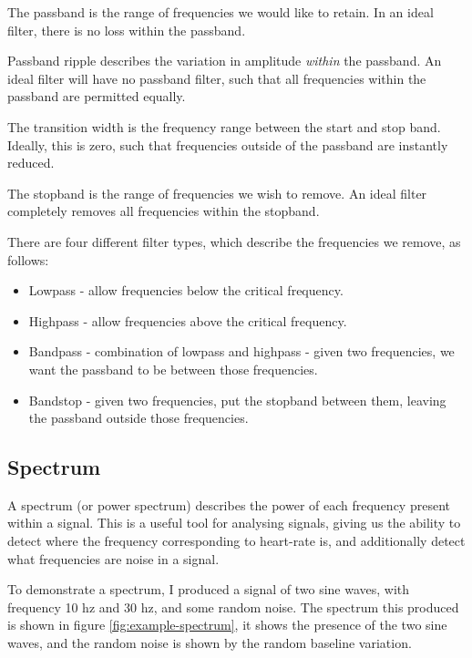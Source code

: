 \documentclass[12pt,a4paper,twoside,openany]{report}
\begin{document}
The passband is the range of frequencies we would like to retain. In an ideal
filter, there is no loss within the passband.

Passband ripple describes the variation in amplitude \emph{within} the
passband. An ideal filter will have no passband filter, such that all
frequencies within the passband are permitted equally.

The transition width is the frequency range between the start and stop band.
Ideally, this is zero, such that frequencies outside of the passband are
instantly reduced.

The stopband is the range of frequencies we wish to remove. An ideal filter
completely removes all frequencies within the stopband.

There are four different filter types, which describe the frequencies we remove, as
follows:

\begin{itemize}
	\item Lowpass - allow frequencies below the critical frequency.

	\item Highpass - allow frequencies above the critical frequency.

	\item Bandpass - combination of lowpass and highpass - given two
		frequencies, we want the passband to be between those
		frequencies.

	\item Bandstop - given two frequencies, put the stopband between them,
		leaving the passband outside those frequencies.
\end{itemize}

\subsection{Spectrum}

A spectrum (or power spectrum) describes the power of each frequency present
within a signal.
This is a useful tool for analysing signals, giving us the ability to detect
where the frequency corresponding to heart-rate is, and additionally detect
what frequencies are noise in a signal.

To demonstrate a spectrum, I produced a signal of two sine waves, with
frequency 10 hz
and 30 hz, and some random noise. The spectrum this produced is shown in 
figure \ref{fig:example-spectrum}, it shows the presence of the two sine
waves, and the random noise is shown by the random baseline variation.
\end{document}
